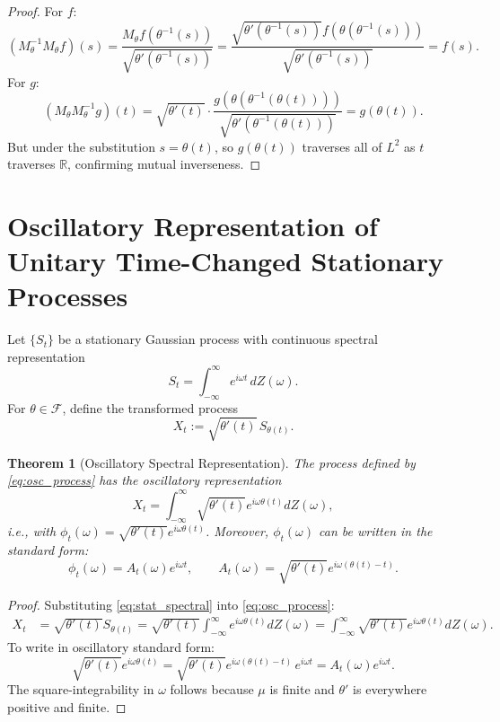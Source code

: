 \documentclass[11pt]{article}
\newtheorem{theorem}{Theorem}
\begin{document}
\begin{proof}
\noindent
For $f$:
\[
(M_\theta^{-1} M_\theta f)(s) = \frac{M_\theta f(\theta^{-1}(s))}{\sqrt{\theta'(\theta^{-1}(s))}} = \frac{\sqrt{\theta'(\theta^{-1}(s))} f(\theta(\theta^{-1}(s)))}{\sqrt{\theta'(\theta^{-1}(s))}} = f(s).
\]
For $g$:
\[
(M_\theta M_\theta^{-1} g)(t) = \sqrt{\theta'(t)} \cdot \frac{g(\theta(\theta^{-1}(\theta(t))))}{\sqrt{\theta'(\theta^{-1}(\theta(t)))}} = g(\theta(t)).
\]
But under the substitution $s = \theta(t)$, so $g(\theta(t))$ traverses all of $L^2$ as $t$ traverses $\mathbb{R}$, confirming mutual inverseness.
\end{proof}

\section{Oscillatory Representation of Unitary Time-Changed Stationary Processes}

Let $\{S_t\}$ be a stationary Gaussian process with continuous spectral representation
\begin{equation}\label{eq:stat_spectral}
    S_t = \int_{-\infty}^{\infty} e^{i\omega t}\, dZ(\omega).
\end{equation}
For $\theta\in\mathcal{F}$, define the transformed process
\begin{equation}\label{eq:osc_process}
    X_t := \sqrt{\theta'(t)}\,S_{\theta(t)}.
\end{equation}

\begin{theorem}[Oscillatory Spectral Representation]\label{thm:spectral}
The process defined by \eqref{eq:osc_process} has the oscillatory representation
\begin{equation}\label{eq:oscillatoryrep}
    X_t = \int_{-\infty}^{\infty} \sqrt{\theta'(t)}e^{i\omega \theta(t)} dZ(\omega),
\end{equation}
i.e., with $\phi_t(\omega) = \sqrt{\theta'(t)}e^{i\omega\theta(t)}$.
Moreover, $\phi_t(\omega)$ can be written in the standard form:
\begin{equation}
    \phi_t(\omega) = A_t(\omega)e^{i\omega t}, \qquad
    A_t(\omega) = \sqrt{\theta'(t)} e^{i\omega(\theta(t)-t)}.
\end{equation}
\end{theorem}

\begin{proof}
Substituting \eqref{eq:stat_spectral} into \eqref{eq:osc_process}:
\begin{align*}
    X_t &= \sqrt{\theta'(t)} S_{\theta(t)} = \sqrt{\theta'(t)} \int_{-\infty}^{\infty} e^{i\omega \theta(t)} dZ(\omega) 
    = \int_{-\infty}^{\infty} \sqrt{\theta'(t)} e^{i\omega \theta(t)} dZ(\omega).
\end{align*}
To write in oscillatory standard form:
\[
    \sqrt{\theta'(t)}e^{i\omega \theta(t)} = \sqrt{\theta'(t)} e^{i\omega (\theta(t)-t)}\, e^{i\omega t} = A_t(\omega) e^{i\omega t}.
\]
The square-integrability in $\omega$ follows because $\mu$ is finite and $\theta'$ is everywhere positive and finite.
\end{proof}
\end{document}
